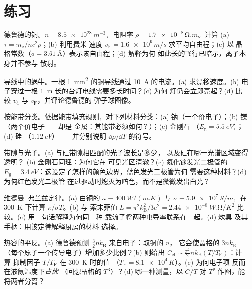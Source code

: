 \section{练习}

\begin{exercise}[$\star$]\label{exo:b3:electrons-in-solids:1}
德鲁德的铜。$n = \qty{8.5e28}{m^{-3}}$，电阻率
$\rho = \qty{1.7e-8}{\ohm.m}$。计算 (a) $\tau =
m_{\text{e}}/ne^2\rho$；(b) 利用费米
速度 $v_{\text{F}} = \qty{1.6e6}{m/s}$ 求平均自由程；(c) 以
晶格常数（$a = \qty{3.61}{\angstrom}$）表示该自由程；(d) 解释为何
如此长的飞行已暗示，离子本身并不参与
散射。
\end{exercise}

\begin{exercise}[$\star$]\label{exo:b3:electrons-in-solids:2}
导线中的蜗牛。一根 \qty{1}{mm^2} 的铜导线通过
\qty{10}{A} 的电流。(a) 求漂移速度。(b) 电子穿过一根
\qty{1}{m} 长的台灯电线需要多长时间？(c) 为何
灯仍会立即亮起？(d) 比较
$v_{\text{d}}$ 与 $v_{\text{F}}$，并评论德鲁德的
弹子球图像。
\end{exercise}

\begin{exercise}[$\star$]\label{exo:b3:electrons-in-solids:3}
按能带分类。依据能带填充规则，对下列材料分类：(a)
钠（一个价电子）；(b) 镁（两个价电子——却是
金属：其能带必须如何？）；(c) 金刚石
（$E_{\text{g}} = \qty{5.5}{eV}$）；(d) 硅
（$\qty{1.12}{eV}$）——并分别说明
$\dd\rho/\dd T$ 的符号。
\end{exercise}

\begin{exercise}[$\star$]\label{exo:b3:electrons-in-solids:4}
带隙与光子。(a) 与硅带隙相匹配的光子波长是多少，
以及硅在哪一光谱区域变得透明？
(b) 金刚石同理：为何它在
可见光区清澈？(c) 氮化镓发光二极管的 $E_{\text{g}} =
\qty{3.4}{eV}$：这设定了怎样的颜色边界，蓝色发光二极管为何
需要这种材料？(d) 为何红色发光二极管
在过驱动时熄灭为暗色，而不是微微发出白光？
\end{exercise}

\begin{exercise}[$\star\star$]\label{exo:b3:electrons-in-solids:5}
维德曼–弗兰兹定律。(a) 由铜的 $\kappa =
\qty{400}{W/(m.K)}$ 与 $\sigma = \qty{5.9e7}{S/m}$，在
\qty{300}{K} 下计算 $\kappa/\sigma T$。(b) 与
索末菲值 $L = \pi^2k_{\text{B}}^2/3e^2 =
\qty{2.44e-8}{W.\ohm/K^2}$ 比较。(c) 用一句话解释为何同一种
载流子将两种电导率联系在一起。(d) 炊具
及其手柄：用该定律解释厨房的材料
选择。
\end{exercise}

\begin{exercise}[$\star\star$]\label{exo:b3:electrons-in-solids:6}
热容的平反。(a) 德鲁德预测
$\tfrac32nk_{\text{B}}$ 来自电子：取铜的 $n$，
它会使晶格的
$3nk_{\text{B}}$（每个原子一个传导电子）增加多少比例？(b)
 则给出 $C_{\text{el}}
\sim \tfrac{\pi^2}{2}nk_{\text{B}}(T/T_{\text{F}})$：计算
抑制因子 $T/T_{\text{F}}$ 在 \qty{300}{K} 时的值
（$T_{\text{F}} = \qty{8.1e4}{K}$）。(c) 为何电子项
反而在液氦温度下\emph{占优}
（回想晶格的 $T^3$）？(d) 哪一种测量，以
$C/T$ 对 $T^2$ 作图，能将两者分离？
\end{exercise}

